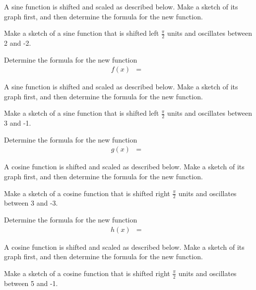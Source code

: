 \begin{problem}
\item A sine function is shifted and scaled as described
  below. Make a sketch of its graph first, and then determine the
  formula for the new function.
  \begin{subproblem}
  \item Make a sketch of a sine function that is shifted left
    $\frac{\pi}{2}$ units and oscillates between 2 and -2. 

    \item Determine the formula for the new function
      \begin{eqnarray*}
        f(x) & = & 
      \end{eqnarray*}
  \end{subproblem}

\item A sine function is shifted and scaled as described
  below. Make a sketch of its graph first, and then determine the
  formula for the new function.
  \begin{subproblem}
  \item Make a sketch of a sine function that is shifted left
    $\frac{\pi}{2}$ units and oscillates between 3 and -1. 

    \item Determine the formula for the new function
      \begin{eqnarray*}
        g(x) & = & 
      \end{eqnarray*}
  \end{subproblem}

\clearpage

\item A cosine function is shifted and scaled as described
  below. Make a sketch of its graph first, and then determine the
  formula for the new function.
  \begin{subproblem}
  \item Make a sketch of a cosine function that is shifted right
    $\frac{\pi}{2}$ units and oscillates between 3 and -3. 

    \item Determine the formula for the new function
      \begin{eqnarray*}
        h(x) & = & 
      \end{eqnarray*}
  \end{subproblem}

\item A cosine function is shifted and scaled as described
  below. Make a sketch of its graph first, and then determine the
  formula for the new function.
  \begin{subproblem}
  \item Make a sketch of a cosine function that is shifted right
    $\frac{\pi}{2}$ units and oscillates between 5 and -1. 


\end{subproblem}
\end{problem}
